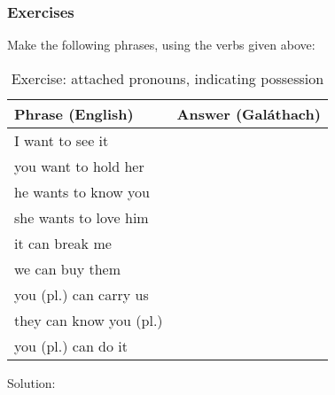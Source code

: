 \subsubsection{Exercises}

Make the following phrases, using the verbs given above:
\begin{table}[H]
\centering
\begin{tabu}{|l|p{10.0cm}|}
  \toprule
  \textbf{Phrase (English)} & \textbf{Answer (Gal\'{a}thach)}\\
  \toprule
  I want to see it & \\
  \midrule
  you want to hold her & \\
  \midrule
  he wants to know you & \\
  \midrule
  she wants to love him & \\
  \midrule
  it can break me & \\
  \midrule
  we can buy them & \\
  \midrule
  you (pl.) can carry us & \\
  \midrule
  they can know you (pl.) & \\
  \midrule
  you (pl.) can do it & \\
  \bottomrule
\end{tabu}
\label{exercises_attached_pronouns_indicating_possession}
\caption{Exercise: attached pronouns, indicating possession}
\end{table}

Solution:\\
\begin{table}[H]
\centering
{}
\label{solution_attached_pronouns_indicating_possession}
\caption{Solution: attached pronouns, indicating possession}
\end{table}
